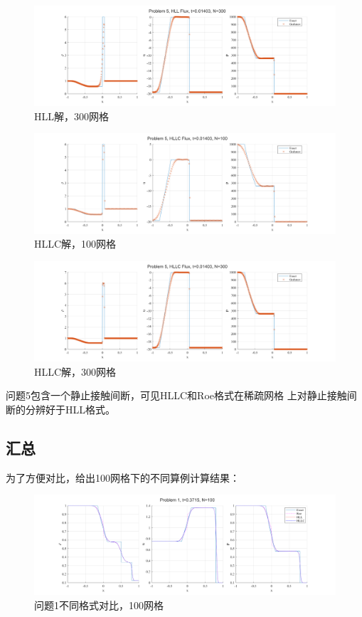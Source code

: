 \documentclass[UTF8,zihao=5]{ctexart} %
\begin{document}
\begin{figure}[H]
    \centering
    \includegraphics[width=18cm]{p5_HLL_N300.png}  %
    \caption{HLL解，300网格}
\end{figure}

\begin{figure}[H]
    \centering
    \includegraphics[width=18cm]{p5_HLLC_N100.png}  %
    \caption{HLLC解，100网格}
\end{figure}

\begin{figure}[H]
    \centering
    \includegraphics[width=18cm]{p5_HLLC_N300.png}  %
    \caption{HLLC解，300网格}
\end{figure}

问题5包含一个静止接触间断，可见HLLC和Roe格式在稀疏网格
上对静止接触间断的分辨好于HLL格式。

\subsection{汇总}

为了方便对比，给出100网格下的不同算例计算结果：

\begin{figure}[H]
    \centering
    \includegraphics[width=18cm]{p1_SUM_N100.png}  %
    \caption{问题1不同格式对比，100网格}
\end{figure}
\end{document}
